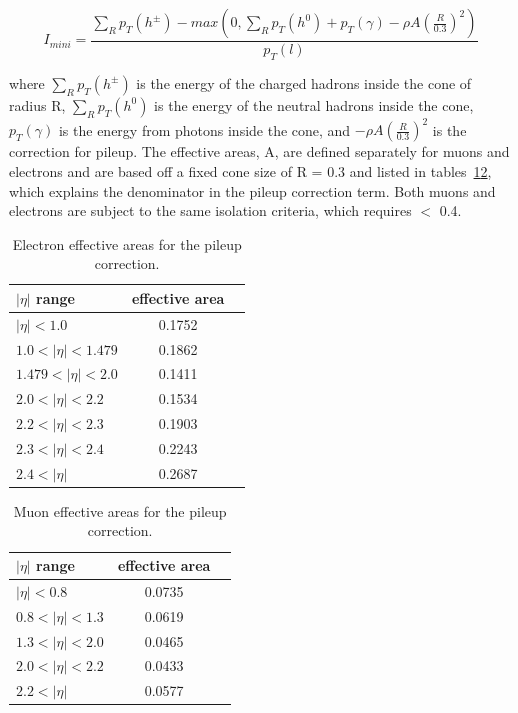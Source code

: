 \begin{equation}
\label{eqn:miniIso}
 I_{mini} = \frac{\sum_{R}p_{T}(h^{\pm}) - max(0,\sum_{R}p_{T}(h^{0}) + p_{T}(\gamma) - \rho A (\frac{R}{0.3})^{2}) }{p_{T}(l)}
\end{equation}

\noindent where $\sum_{R}p_{T}(h^{\pm})$ is the energy of the charged hadrons inside the cone of radius R, $\sum_{R}p_{T}(h^{0})$ is the energy of the neutral hadrons inside the cone, $p_{T}(\gamma)$ is
the energy from photons inside the cone, and $-\rho A (\frac{R}{0.3})^{2}$ is the correction for pileup. The effective areas, A, are defined separately for muons and electrons and are based off a fixed
cone size of R = 0.3 and listed in tables~\ref{tab:ele_effArea}\ref{tab:mu_effArea}, which explains the denominator in the pileup correction term. Both muons and electrons are subject to the same isolation criteria, which requires \miniIso $<$ 0.4.

\begin{table}[hbtp]
\centering
\caption[Electron effective areas for the pileup correction.]{Electron effective areas for the pileup correction.}
\begin{tabular}{lcc}
\hline
$|\eta|$ range & effective area \\
\hline
$|\eta| < 1.0$ & 0.1752 \\
$1.0 < |\eta| < 1.479$ & 0.1862 \\
$1.479 < |\eta| < 2.0$ & 0.1411 \\
$2.0 < |\eta| < 2.2$ & 0.1534 \\
$2.2 < |\eta| < 2.3$ & 0.1903 \\
$2.3 < |\eta| < 2.4$ & 0.2243 \\
$2.4 < |\eta|$ & 0.2687 \\
\hline
\end{tabular}
\label{tab:ele_effArea}
\end{table}

\begin{table}[hbtp]
\centering
\caption[Muon effective areas for the pileup correction.]{Muon effective areas for the pileup correction.}
\begin{tabular}{lcc}
\hline
$|\eta|$ range & effective area \\
\hline
$|\eta| < 0.8$ & 0.0735 \\
$0.8 < |\eta| < 1.3$ & 0.0619 \\
$1.3 < |\eta| < 2.0$ & 0.0465 \\
$2.0 < |\eta| < 2.2$ & 0.0433 \\
$2.2 < |\eta|$ & 0.0577 \\
\hline
\end{tabular}
\label{tab:mu_effArea}
\end{table}

